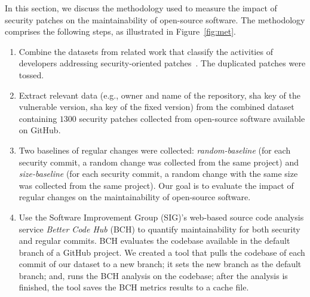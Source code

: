 \documentclass[smallextended]{svjour3}       %
\begin{document}
In this section, we discuss the methodology used to measure
the impact of security patches on the maintainability of open-source
software. The methodology comprises the following steps, as 
illustrated in Figure~\ref{fig:met}.
%
\begin{enumerate}
	\item Combine the datasets from related work that classify
	the activities of developers addressing security-oriented 
  patches~\cite{reis2017secbench,10.1109/MSR.2019.00064}. The
  duplicated patches were tossed.
%
	\item
	Extract relevant data (e.g., owner and name of
	the repository, sha key of the vulnerable version, sha key of 	
	the fixed version) from the combined dataset 	
	containing $1300$ security patches collected from open-source 	
	software available on GitHub.
%
  \item Two baselines of regular changes were collected:
  \textit{random-baseline} (for each security commit, a random change 
  was collected from the same project) and \textit{size-baseline} (for 
  each security commit, a random change with the same size
  was collected from the same project). Our goal is to evaluate the impact 
	of regular changes on the maintainability of open-source 
	software.
%
  \item Use the Software Improvement Group (SIG)'s web-based source 
  code analysis service \emph{Better Code Hub} (BCH)
  to quantify maintainability for both security and regular commits. 
  BCH evaluates the codebase available in the default branch of a GitHub project. 
  We created a tool that pulls the codebase of each commit of our dataset 
  to a new branch; it sets the new branch as the default branch; and, runs 
  the BCH analysis on the codebase; after the analysis is finished, the tool saves 
  the BCH metrics results to a cache file.
\end{enumerate}
%
\end{document}
